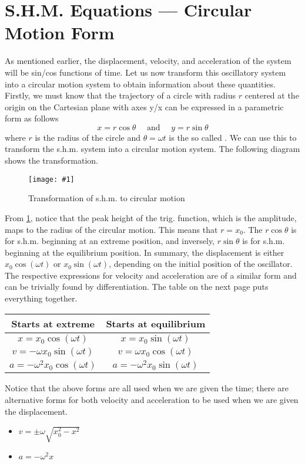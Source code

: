\documentclass[a4paper,12pt]{article}
\let\oldsection\section
\renewcommand\section{\clearpage\oldsection}
\newcommand{\lb}{\\[8pt]}
\newcommand{\img}[4]{\begin{center}
  \begin{figure}[H]
    \centering
    \texttt{[image: \#1]}
    \caption{#3}
    \label{fig:#4}
  \end{figure}
\end{center}}
\begin{document}
\section{S.H.M. Equations --- Circular Motion Form}
As mentioned earlier, the displacement, velocity, and acceleration of the system will be sin/cos functions of time. Let us now transform this oscillatory system into a circular motion system to obtain information about these quantities.\lb
Firstly, we must know that the trajectory of a circle with radius $r$ centered at the origin on the Cartesian plane with axes y/x can be expressed in a parametric form as follows
$$x = r\cos\theta\quad\text{ and }\quad y = r\sin\theta$$
where $r$ is the radius of the circle and $\theta = \omega t$ is the so called . We can use this to transform the s.h.m. system into a circular motion system. The following diagram shows the transformation.
\img{circ.png}{0.6}{Transformation of s.h.m. to circular motion}{circ}
From \cref{fig:circ}, notice that the peak height of the trig. function, which is the amplitude, maps to the radius of the circular motion. This means that $r = x_0$. The $r\cos \theta$ is for s.h.m. beginning at an extreme position, and inversely, $r\sin \theta$ is for s.h.m. beginning at the equilibrium position. In summary, the displacement is either $x_0\cos(\omega t)$ or $x_0\sin(\omega t)$, depending on the initial position of the oscillator. The respective expressions for velocity and acceleration are of a similar form and can be trivially found by differentiation. The table on the next page puts everything together.\pagebreak
\begin{table}[H]
  \centering
  \def\arraystretch{1.2}
  \begin{tabular}{|c | c |}
    \hline \rowcolor{Blue!25} Starts at extreme & Starts at equilibrium             \\
    \hline
    $x = x_0\cos(\omega t)$                     & $x = x_0\sin(\omega t)$           \\ \hline
    $v = -\omega x_0\sin(\omega t)$             & $v = \omega x_0\cos(\omega t)$    \\ \hline
    $a = -\omega^2 x_0\cos(\omega t)$           & $a = -\omega^2 x_0\sin(\omega t)$ \\\hline
  \end{tabular}
\end{table}
Notice that the above forms are all used when we are given the time; there are alternative forms for both velocity and acceleration to be used when we are given the displacement.
\begin{itemize}
  \item $v = \pm \omega \sqrt{x_0^2 - x^2}$
  \item $a = -\omega^2 x$
\end{itemize}
\end{document}
